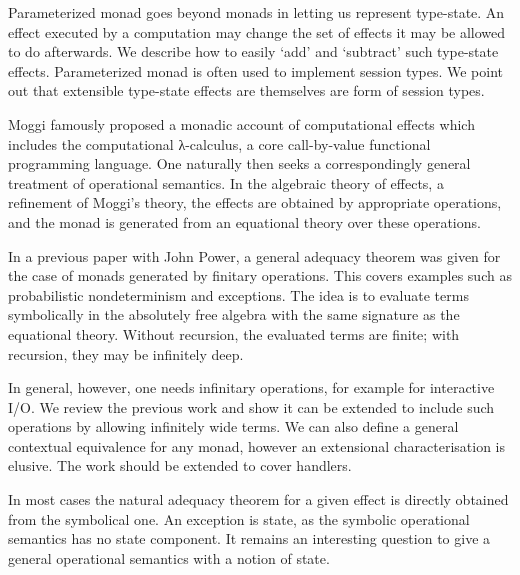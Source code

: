 \documentclass[a4paper,UKenglish]{dagrep}
\begin{document}
Parameterized monad goes beyond monads in letting us represent
type-state. An effect executed by a computation may change the
set of effects it may be allowed to do afterwards. We describe
how to easily `add' and `subtract' such type-state
effects. Parameterized monad is often used to implement session
types. We point out that extensible type-state effects are
themselves are form of session types.

\license

Moggi famously proposed a monadic account of computational effects which includes the computational λ-calculus, a core call-by-value functional programming language. One naturally then seeks  a correspondingly general treatment of operational semantics. In the algebraic theory of effects, a refinement of Moggi’s theory, the effects are obtained by appropriate operations, and the monad is  generated from an equational theory over these operations.

 In a previous paper with John Power,  a general adequacy theorem was given  for the case of monads generated by finitary operations. This covers examples such as probabilistic nondeterminism and exceptions. The  idea is to evaluate terms symbolically in the absolutely free algebra with the same signature as the equational theory. Without recursion, the evaluated terms are finite; with recursion, they may be infinitely deep.


In general, however, one needs infinitary operations, for example for interactive I/O. We review the previous work and show it can be extended to include such operations by allowing infinitely wide terms. We can also define a general contextual equivalence for any monad, however an extensional characterisation is elusive. The work should be extended to cover handlers.

In most cases the natural adequacy theorem for a given effect is directly obtained from the symbolical one. An exception is state, as the symbolic operational semantics has no state component. It remains an interesting question to give a general operational semantics with a notion of state.

\license
{}
\end{document}
